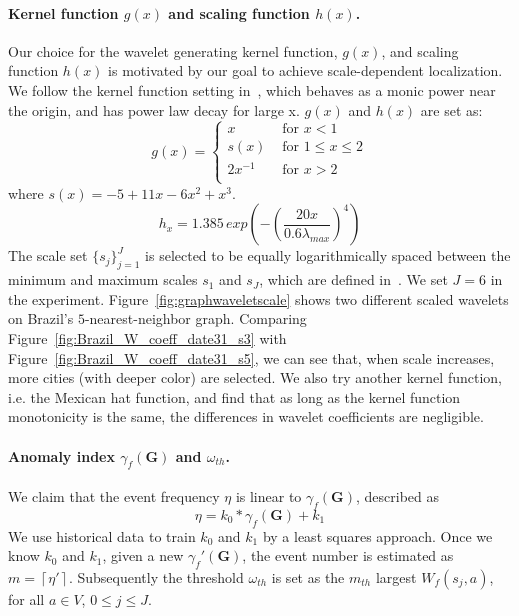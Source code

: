 \paragraph{Kernel function $g(x)$ and scaling function $h(x)$.}
Our choice for the wavelet generating kernel function, $g(x)$, and scaling function $h(x)$ is motivated by our goal to achieve scale-dependent localization. We follow the kernel function setting in~\cite{hammond2011wavelets}, which behaves as a monic power near the origin, and has power law decay for large x. $g(x)$ and $h(x)$ are set as:
\begin{equation}
g(x) = \left\{ \begin{array}{rl}
 x &\mbox{ for $x<1$} \\
s(x) &\mbox{ for $1\leq x \leq 2$} \\
 2x^{-1} &\mbox{ for $x>2$} \\
       \end{array} \right.
\end{equation} where $s(x)=-5+11x-6x^2+x^3$.
\begin{equation}
h_{x}= 1.385\, exp(-(\frac{20x}{0.6\lambda_{max}})^4)
\end{equation}
The scale set $\{s_j\}_{j=1}^J$ is selected to be equally logarithmically spaced between the minimum and maximum scales $s_1$ and $s_J$, which are defined in~\cite{hammond2011wavelets}. We set $J=6$ in the experiment. Figure~\ref{fig:graphwaveletscale} shows two different scaled wavelets on Brazil's $5$-nearest-neighbor graph. Comparing Figure~\ref{fig:Brazil_W_coeff_date31_s3} with Figure~\ref{fig:Brazil_W_coeff_date31_s5}, we can see that, when scale increases, more cities (with deeper color) are selected.
We also try another kernel function, i.e. the Mexican hat function, and find that as long as the kernel function monotonicity is the same,
the differences in wavelet coefficients are negligible.

\paragraph{Anomaly index $\gamma_f(\mathbf{G})$ and $\omega_{th}$.}
We claim that the event frequency $\eta$ is linear to $\gamma_f(\mathbf{G})$, described as
\begin{equation}
\label{eq:linear_equation}
\eta = k_0*\gamma_f(\mathbf{G}) + k_1
\end{equation}We use historical data to train $k_0$ and $k_1$ by a
least squares approach. Once we know
$k_0$ and $k_1$, given a new $\gamma_f'(\mathbf{G})$, the event number is estimated as $m=\left \lceil \eta' \right \rceil$. Subsequently the
threshold $\omega_{th}$ is set as the $m_{th}$ largest $W_f(s_j,a)$, for all $a\in V$, $0\le j \le J$.


